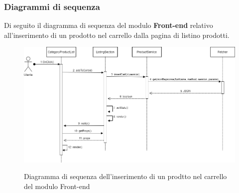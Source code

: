 \subsubsection{Diagrammi di sequenza}
Di seguito il diagramma di sequenza del modulo \textbf{Front-end} relativo all'inserimento di un prodotto nel carrello dalla pagina di listino prodotti.

\vspace{1cm}

\begin{figure}[H]
\centering
\includegraphics[scale=0.5]{res/Architettura/Frontend/img/sequence_frontend_insertCart}\\
\caption{Diagramma di sequenza dell'inserimento di un prodtto nel carrello del modulo Front-end}
\end{figure}